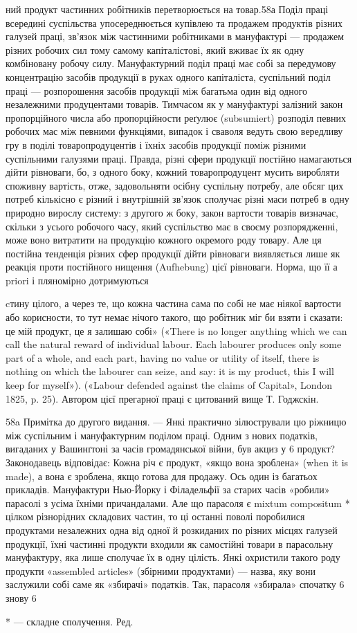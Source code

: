 ний продукт частинних робітників перетворюється на товар.58а
Поділ праці всередині суспільства упосереднюється купівлею та
продажем продуктів різних галузей праці, зв’язок між частинними
робітниками в мануфактурі — продажем різних робочих
сил тому самому капіталістові, який вживає їх як одну комбіновану
робочу силу. Мануфактурний поділ праці має собі за передумову
концентрацію засобів продукції в руках одного капіталіста,
суспільний поділ праці — розпорошення засобів продукції
між багатьма один від одного незалежними продуцентами товарів.
Тимчасом як у мануфактурі залізний закон пропорційного числа
або пропорційности реґулює (subsumiert) розподіл певних робочих
мас між певними функціями, випадок і сваволя ведуть свою
вередливу гру в поділі товаропродуцентів і їхніх засобів продукції
поміж різними суспільними галузями праці. Правда, різні сфери
продукції постійно намагаються дійти рівноваги, бо, з одного
боку, кожний товаропродуцент мусить виробляти споживну вартість,
отже, задовольняти осібну суспільну потребу, але обсяг
цих потреб кількісно є різний і внутрішній зв’язок сполучає
різні маси потреб в одну природно вирослу систему: з другого ж
боку, закон вартости товарів визначає, скільки з усього робочого
часу, який суспільство має в своєму розпорядженні, може воно
витратити на продукцію кожного окремого роду товару. Але ця
постійна тенденція різних сфер продукції дійти рівноваги виявляється
лише як реакція проти постійного нищення (Aufhebung)
цієї рівноваги. Норма, що її а priori і пляномірно дотримуються

cтину цілого, а через те, що кожна частина сама по собі не має ніякої
вартости або корисности, то тут немає нічого такого, що робітник міг би
взяти і сказати: це мій продукт, це я залишаю собі» («There is no longer
anything which we can call the natural reward of individual labour.
Each labourer produces only some part of a whole, and each part, having no
value or utility of itself, there is nothing on which the labourer can seize,
and say: it is my product, this I will keep for myself»). («Labour defended
against the claims of Capital», London 1825, p. 25). Автором цієї
прегарної праці є цитований вище Т. Годжскін.

58a Примітка до другого видання. — Янкі практично зілюстрували
цю ріжницю між суспільним і мануфактурним поділом праці. Одним
з нових податків, вигаданих у Вашинґтоні за часів громадянської війни,
був акциз у 6%
продукт? Законодавець відповідає: Кожна річ є продукт,
«якщо вона зроблена» (when it is made), а вона є зроблена, якщо готова
для продажу. Ось один із багатьох прикладів. Мануфактури Нью-Йорку
і Філадельфії за старих часів «робили» парасолі з усіма їхніми причандалами.
Але що парасоля є mixtum compositum * цілком різнорідних
складових частин, то ці останні поволі поробилися продуктами незалежних
одна від одної й розкиданих по різних місцях галузей продукції,
їхні частинні продукти входили як самостійні товари в парасольну
мануфактуру, яка лише сполучає їх в одну цілість. Янкі охристили такого
роду продукти «assembled articles» (збірними продуктами) — назва,
яку вони заслужили собі саме як «збирачі» податків. Так, парасоля «збирала»
спочатку 6%
знову 6%

* — складне сполучення. Ред.
